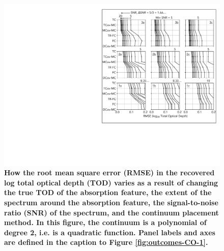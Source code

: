 \documentclass[manuscript]{aastex62}
\begin{document}
{\begin{figure}
  \includegraphics[width=\linewidth]{figures/annotated_co2_RMSEs_vs_SNR.pdf}
  \caption{
  \bf
  How the root mean square error (RMSE) in the recovered log total optical depth (TOD) varies as a result of changing the true TOD of the absorption feature, the extent of the spectrum around the absorption feature, the signal-to-noise ratio (SNR) of the spectrum, and the continuum placement method.
  In this figure, the continuum is a polynomial of degree 2, i.e. is a quadratic function.
  Panel labels and axes are defined in the caption to Figure \ref{fig:outcomes-CO-1}.
  }
  \label{fig:outcomes-CO-2}
\end{figure}

}
\end{document}
